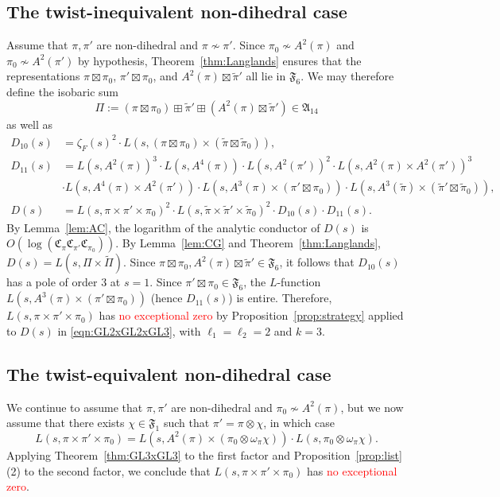 \documentclass[11pt]{amsart}
\theoremstyle{remark}
\renewcommand{\tilde}{\widetilde}
\newcommand{\fF}{\mathfrak{F}}
\newcommand{\fA}{\mathfrak{A}}
\numberwithin{equation}{section}
\begin{document}
\subsection{The twist-inequivalent non-dihedral case}
Assume that $\pi,\pi'$ are non-dihedral and $\pi \not\sim \pi'$.  Since $\pi_0\not\sim A^2(\pi)$ and $\pi_0\not\sim A^2(\pi')$ by hypothesis, Theorem~\ref{thm:Langlands} ensures that the representations $\pi\boxtimes\pi_0$, $\pi'\boxtimes\pi_0$, and $A^2(\pi)\boxtimes \tilde{\pi}'$ all lie in $\mathfrak{F}_6$.  We may therefore define the isobaric sum
\[
\Pi := (\pi \boxtimes \pi_0) \boxplus \widetilde{\pi}' \boxplus (A^2(\pi) \boxtimes \widetilde{\pi}')\in \fA_{14}
\]
as well as
\begin{equation}
\label{eqn:GL2xGL2xGL3}
\begin{aligned}
    D_{10}(s) &= \zeta_F(s)^2\cdot L(s,(\pi \boxtimes \pi_0) \times (\widetilde\pi \boxtimes \widetilde{\pi}_0)),\\
    D_{11}(s) &= L(s,A^2(\pi))^3\cdot L(s,A^4(\pi)) \cdot L(s,A^2(\pi'))^2 \cdot L(s,A^2(\pi)\times A^2(\pi'))^3 \\
    &\cdot L(s,A^4(\pi)\times A^2(\pi'))\cdot L(s,A^3(\pi)\times(\pi'\boxtimes\pi_0))\cdot L(s,A^3(\widetilde{\pi})\times(\tilde{\pi}'\boxtimes\tilde{\pi}_0)),\\
    D(s)&=L(s,\pi\times\pi'\times\pi_0)^2 \cdot L(s,\tilde{\pi}\times\tilde{\pi}'\times\tilde{\pi}_0)^2 \cdot D_{10}(s)\cdot D_{11}(s).
\end{aligned}
\end{equation}
By Lemma~\ref{lem:AC}, the logarithm of the analytic conductor of $D(s)$ is $O(\log(\mathfrak{C}_{\pi}\mathfrak{C}_{\pi'}\mathfrak{C}_{\pi_0}))$. By Lemma~\ref{lem:CG} and Theorem~\ref{thm:Langlands}, $D(s) = L(s,\Pi\times\tilde{\Pi})$.  Since $\pi \boxtimes \pi_0, A^2(\pi) \boxtimes \tilde{\pi}' \in \fF_6$, it follows that $D_{10}(s)$ has a pole of order $3$ at $s=1$.  Since $\pi'\boxtimes\pi_0\in\mathfrak{F}_6$, the $L$-function $L(s,A^3(\pi) \times (\pi' \boxtimes \pi_0))$ (hence $D_{11}(s)$) is entire.  Therefore, $L(s,\pi \times \pi' \times \pi_0)$ has \textcolor{red}{no exceptional zero} by Proposition~\ref{prop:strategy} applied to $D(s)$ in \eqref{eqn:GL2xGL2xGL3}, with $\ell_1 = \ell_2 = 2$ and $k = 3$. 

\subsection{The twist-equivalent non-dihedral case}
We continue to assume that $\pi,\pi'$ are non-dihedral and $\pi_0 \not\sim A^2(\pi)$, but we now assume that there exists $\chi\in\mathfrak{F}_1$ such that $\pi' = \pi \otimes \chi$, in which case
\[
L(s,\pi \times \pi' \times \pi_0) = L(s,A^2(\pi) \times (\pi_0 \otimes \omega_\pi\chi)) \cdot L(s,\pi_0 \otimes \omega_\pi\chi).
\]
Applying Theorem~\ref{thm:GL3xGL3} to the first factor and Proposition~\ref{prop:list}(2) to the second factor, we conclude that $L(s,\pi \times \pi' \times \pi_0)$ has \textcolor{red}{no exceptional zero}.
\end{document}
